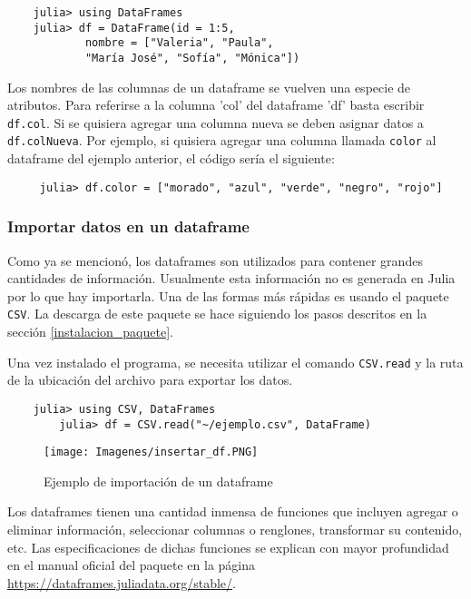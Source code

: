 \begin{verbatim}
	julia> using DataFrames
	julia> df = DataFrame(id = 1:5, 
   			nombre = ["Valeria", "Paula", 
   			"María José", "Sofía", "Mónica"])
\end{verbatim}

Los nombres de las columnas de un dataframe se vuelven una especie de atributos. Para referirse a la columna 'col' del dataframe 'df' basta escribir \texttt{df.col}. Si se quisiera agregar una columna nueva se deben asignar datos a \texttt{df.colNueva}. Por ejemplo, si quisiera agregar una columna llamada \texttt{color} al dataframe del ejemplo anterior, el código sería el siguiente: 

\begin{verbatim}
     julia> df.color = ["morado", "azul", "verde", "negro", "rojo"]
\end{verbatim}

\subsubsection{Importar datos en un dataframe}

Como ya se mencionó, los dataframes son utilizados para contener grandes cantidades de información. Usualmente esta información no es generada en \textsf{Julia} por lo que hay importarla. Una de las formas más rápidas es usando el paquete \texttt{CSV}. La descarga de este paquete se hace siguiendo  los pasos descritos en la sección \ref{instalacion_paquete}. 

Una vez instalado el programa, se necesita utilizar el comando \texttt{CSV.read} y la ruta de la ubicación del archivo para exportar los datos. 

\begin{verbatim}
	julia> using CSV, DataFrames
        julia> df = CSV.read("~/ejemplo.csv", DataFrame)
\end{verbatim}

\begin{figure}[h]
\begin{center}
\texttt{[image: Imagenes/insertar\_df.PNG]}
	\caption{Ejemplo de importación de un dataframe}
  \label{insertar_df}
\end{center}
\end{figure}

Los dataframes tienen una cantidad inmensa de funciones que incluyen agregar o eliminar información, seleccionar columnas o renglones, transformar su contenido, etc. Las especificaciones de dichas funciones se explican con mayor profundidad en el manual oficial del paquete en la página \url{https://dataframes.juliadata.org/stable/}. 

